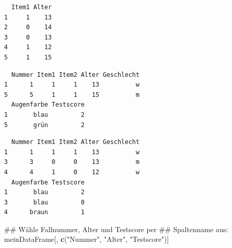 \documentclass[12pt,]{tufte-book}
\newenvironment{Shaded}{\begin{snugshade}}{\end{snugshade}}
\newcommand{\KeywordTok}[1]{\textcolor[rgb]{0.13,0.29,0.53}{\textbf{#1}}}
\newcommand{\DecValTok}[1]{\textcolor[rgb]{0.00,0.00,0.81}{#1}}
\newcommand{\StringTok}[1]{\textcolor[rgb]{0.31,0.60,0.02}{#1}}
\newcommand{\OperatorTok}[1]{\textcolor[rgb]{0.81,0.36,0.00}{\textbf{#1}}}
\newcommand{\NormalTok}[1]{#1}
\theoremstyle{definition}
\theoremstyle{definition}
\theoremstyle{definition}
\theoremstyle{remark}
\begin{document}
\begin{verbatim}
  Item1 Alter
1     1    13
2     0    14
3     0    13
4     1    12
5     1    15
\end{verbatim}

\begin{Shaded}
\end{Shaded}

\begin{verbatim}
  Nummer Item1 Item2 Alter Geschlecht
1      1     1     1    13          w
5      5     1     1    15          m
  Augenfarbe Testscore
1       blau         2
5       grün         2
\end{verbatim}

\begin{Shaded}
\end{Shaded}

\begin{verbatim}
  Nummer Item1 Item2 Alter Geschlecht
1      1     1     1    13          w
3      3     0     0    13          m
4      4     1     0    12          w
  Augenfarbe Testscore
1       blau         2
3       blau         0
4      braun         1
\end{verbatim}

\begin{Shaded}
\begin{Highlighting}[]
\NormalTok{## Wähle Fallnummer, Alter und Testscore per}
\NormalTok{## Spaltenname aus:}
\NormalTok{meinDataFrame[, }\KeywordTok{c}\NormalTok{(}\StringTok{"Nummer"}\NormalTok{, }\StringTok{"Alter"}\NormalTok{, }\StringTok{"Testscore"}\NormalTok{)]}
\end{Highlighting}
\end{Shaded}
\end{document}
